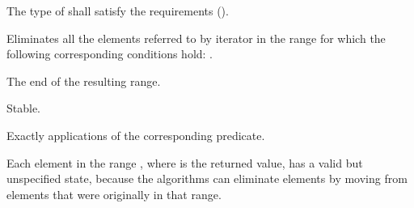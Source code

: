 \begin{itemdescr}
\pnum
\requires
The type of
shall satisfy the 
requirements ().

\pnum
\effects
Eliminates all the elements referred to by iterator
in the range 
for which the following corresponding conditions hold:
.

\pnum
\returns
The end of the resulting range.

\pnum
\remarks Stable.

\pnum
\complexity
Exactly
applications of the corresponding predicate.

\pnum
\begin{note}
Each element in the range , where  is
the returned value, has a valid but unspecified state, because the algorithms
can eliminate elements by moving from elements that were originally
in that range.
\end{note}
\end{itemdescr}

